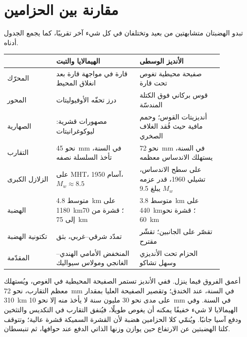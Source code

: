 \section{مقارنة بين الحزامين}\label{sec:b2:himalaya-andes:compared}

تبدو الهضبتان متشابهتين من بعيد وتختلفان في كل شيء آخر تقريبًا، كما يجمع الجدول
أدناه.

\begin{omfigure}
\centering\small
\begin{tabular}{>{\raggedright\arraybackslash}p{0.2\linewidth}|>{\raggedright\arraybackslash}p{0.34\linewidth}|>{\raggedright\arraybackslash}p{0.34\linewidth}}
 & الهيمالايا والتبت & الأنديز الوسطى \\ \hline
المحرّك & قارة في مواجهة قارة بعد انغلاق المحيط & صفيحة محيطية تغوص تحت قارة \\
المحور & درز تحفّه الأوفيوليتات & قوس بركاني فوق الكتلة المندسّة \\
الصهارية & مصهورات قشرية: ليوكوغرانيتات & أنديزيتات القوس؛ وحمم مافية حيث فُقد الغلاف الصخري \\
التقارب & نحو \qty{45}{mm} في السنة، تأخذ السلسلة نصفه & نحو \qty{72}{mm} في السنة، يستهلك الاندساس معظمه \\
الزلازل الكبرى & على MHT، آسام 1950، $M_w \approx 8.5$ & على سطح الاندساس، تشيلي 1960، قدر عزمه $M_w$ يبلغ 9.5 \\
الهضبة & متوسط \qty{4.8}{km} على \qty{1180}{km}؛ قشرة من 70 إلى \qty{75}{km} & متوسط \qty{3.8}{km} على \qty{440}{km}؛ قشرة نحو \qty{60}{km} \\
تكتونية الهضبة & تمدّد شرقي--غربي، بثق & تقصّر على الجانبين؛ تقشّر مقترح \\
المقدّمة & المنخفض الأمامي الهندي--الغانجي ومولاس سيواليك & الحزام تحت الأنديزي وسهل تشاكو \\
\end{tabular}
\par{}
\end{omfigure}

أعمق الفروق فيما ينزل. ففي الأنديز تستمر الصفيحة المحيطية في الغوص،
ويُستهلك معظم التقارب، نحو \qty{72}{mm} في السنة، عند الخندق؛ وتقصير
الصفيحة العليا بمقدار \qty{310}{km} على مدى نحو 30 مليون سنة لا يأخذ منه إلا نحو \qty{10}{mm} في
السنة. وفي الهيمالايا لا شيء خفيفًا يمكنه أن يغوص طويلًا، فيُنفق التقارب في
التكديس والتثخين ودفع آسيا جانبًا. ويُنمّي كلا الحزامين هضبة لأن القشرة السميكة
قشرة عالية؛ وتتوقف كلتا الهضبتين عن الارتفاع حين يوازن وزنها الذاتي الدفع عند
حوافها، ثم تنبسطان.

